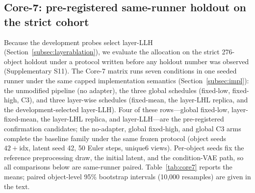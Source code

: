 \documentclass[times,twocolumn,final]{elsarticle}
\begin{document}
\subsection{Core-7: pre-registered same-runner holdout on the strict cohort}
\label{subsec:core7}
\label{subsec:confirmation}

Because the development probes select layer-LLH (Section~\ref{subsec:layerablation}), we evaluate the allocation on the strict 276-object holdout under a protocol written before any holdout number was observed (Supplementary S11). The Core-7 matrix runs seven conditions in one seeded runner under the same capped implementation semantics (Section~\ref{subsec:impl}): the unmodified pipeline (no adapter), the three global schedules (fixed-low, fixed-high, C3), and three layer-wise schedules (fixed-mean, the layer-LHL replica, and the development-selected layer-LLH). Four of these rows---global fixed-low, layer-fixed-mean, the layer-LHL replica, and layer-LLH---are the pre-registered confirmation candidates; the no-adapter, global fixed-high, and global C3 arms complete the baseline family under the same frozen protocol (object seeds $42+\mathrm{idx}$, latent seed 42, 50 Euler steps, unique6 views). Per-object seeds fix the reference preprocessing draw, the initial latent, and the condition-VAE path, so all comparisons below are same-runner paired. Table~\ref{tab:core7} reports the means; paired object-level 95\% bootstrap intervals (10,000 resamples) are given in the text.
\end{document}
